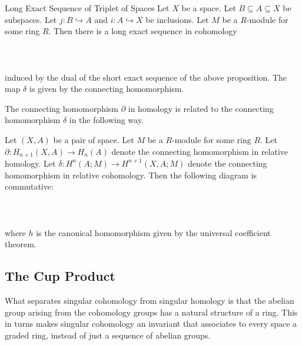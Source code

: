 \documentclass[a4paper]{article}
\begin{document}
\begin{thm}{Long Exact Sequence of Triplet of Spaces}{} Let $X$ be a space. Let $B\subseteq A\subseteq X$ be subspaces. Let $j:B\hookrightarrow A$ and $i:A\hookrightarrow X$ be inclusions. Let $M$ be a $R$-module for some ring $R$. Then there is a long exact sequence in cohomology \\~\\
\\~\\
induced by the dual of the short exact sequence of the above proposition. The map $\delta$ is given by the connecting homomorphism. 
\end{thm}

The connecting homomorphism $\partial$ in homology is related to the connecting homomorphism $\delta$ in the following way. 

\begin{prp}{}{} Let $(X,A)$ be a pair of space. Let $M$ be a $R$-module for some ring $R$. Let $\partial:H_{n+1}(X,A)\to H_n(A)$ denote the connecting homomorphism in relative homology. Let $\delta:H^n(A;M)\to H^{n+1}(X,A;M)$ denote the connecting homomorphism in relative cohomology. Then the following diagram is commutative: \\~\\
\\~\\
where $h$ is the canonical homomorphism given by the universal coefficient theorem. 
\end{prp}

\subsection{The Cup Product}
What separates singular cohomology from singular homology is that the abelian group arising from the cohomology groups has a natural structure of a ring. This in turns makes singular cohomology an invariant that associates to every space a graded ring, instead of just a sequence of abelian groups. \\~\\
\end{document}
